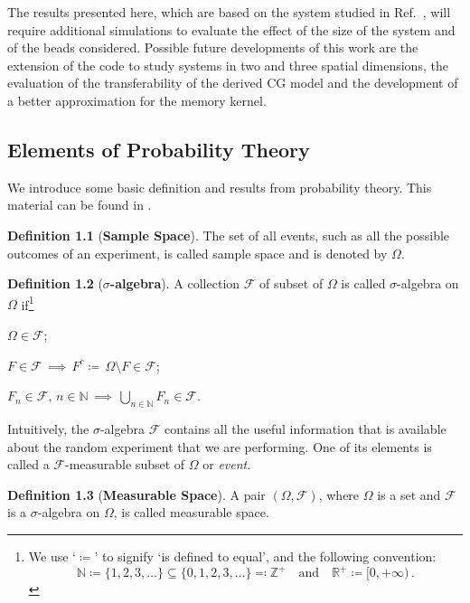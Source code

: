 \documentclass[10pt,a4paper]{book}
\theoremstyle{definition}
\newtheorem{defin}{Definition}[chapter]
\begin{document}
The results presented here, which are based on the system studied in Ref.~\cite{DiPasquale2019}, will require additional simulations to evaluate the effect of the size of the system and of the beads considered. Possible future developments of this work are the extension of the code to study systems in two and three spatial dimensions, the evaluation of the transferability of the derived CG model and the development of a better approximation for the memory kernel.


\begin{appendices}

\chapter{Elements of Probability Theory}
\label{App:A}
We introduce some basic definition and results from probability theory. This material can be found in \cite{Williams1991}. 

\begin{defin}[\textbf{Sample Space}]
The set of all events, such as all the possible outcomes of an experiment, is called sample space and is denoted by $\Omega$.  
\end{defin}

\begin{defin}[\textbf{$\sigma$-algebra}]
A collection $\mathscr{F}$ of subset of $\Omega$ is called $\sigma$-algebra on $\Omega$ if\footnote{We use `$\coloneqq$' to signify `is defined to equal', and the following convention:
$$\mathbb{N}\coloneqq\{1,2,3,\dots\} \subseteq \{0,1,2,3,\dots\}\eqqcolon\mathbb{Z}^+\quad\mathrm{and}\quad\mathbb{R}^+\coloneqq[0,+\infty)\,. $$}
\begin{compactenum}[(i)] 
\item $\Omega\in\mathscr{F}$; 
\item $F\in\mathscr{F}\,\implies\, F^c\coloneqq\,\Omega\setminus F\in\mathscr{F}$;
\item $F_n\in\mathscr{F},\,n\in\mathbb{N}\,\implies\,\bigcup_{n\in\mathbb{N}}F_n\in\mathscr{F}$.
\end{compactenum}   
\end{defin}
\noindent
Intuitively, the $\sigma$-algebra $\mathscr{F}$ contains all the useful information that is available about the random experiment that we are performing. One of its elements is called a $\mathscr{F}$-measurable subset of $\Omega$ or \textit{event}.

\begin{defin}[\textbf{Measurable Space}]
A pair $(\Omega,\mathscr{F})$, where $\Omega$ is a set and $\mathscr{F}$ is a $\sigma$-algebra on $\Omega$, is called measurable space.
\end{defin}


\end{appendices}
\end{document}
